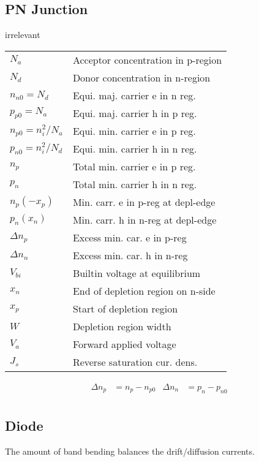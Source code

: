 \documentclass[a4paper, fontsize=8pt, landscape, DIV=1]{scrartcl}
\newcommand{\makeultracompact}{irrelevant}
\begin{document}
\begin{multicols*}{4}
  \section{PN Junction}
  \ifdefined\makeultracompact
  \else
    \begin{tabular}[h]{l l}
      $N_a$   & Acceptor concentration in p-region \\
      $N_d$   & Donor concentration in n-region \\
      $n_{n0}=N_d$   & Equi. maj. carrier e in n reg. \\
      $p_{p0}=N_a$   & Equi. maj. carrier h in p reg. \\
      $n_{p0}=n_i^2/N_a$  & Equi. min. carrier e in p reg.  \\
      $p_{n0}=n_i^2/N_d$  & Equi. min. carrier h in n reg.  \\
      $n_p$   &  Total min. carrier e in p reg.\\
      $p_n$   &  Total min. carrier h in n reg.\\
      $n_p(-x_p)$   &  Min. carr. e in p-reg at depl-edge\\
      $p_n(x_n)$    &  Min. carr. h in n-reg at depl-edge\\
      $\Delta n_p$   & Excess min. car. e in p-reg \\
      $\Delta n_n$   & Excess min. car. h in n-reg \\
      $V_{bi}$& Builtin voltage at equilibrium \\
      $x_n$   & End of depletion region on n-side\\
      $x_p$   & Start of depletion region\\
      $W$     & Depletion region width\\
      $V_a$     & Forward applied voltage\\
      $J_s$     & Reverse saturation cur. dens.\\
    \end{tabular}
  \fi
  \begin{align*}
    \Delta n_p &= n_p - n_{p0} & \Delta n_n &= p_n - p_{n0} \\
  \end{align*}

  \subsection{Diode}
    The amount of band bending balances the drift/diffusion currents.


\end{multicols*}
\end{document}

